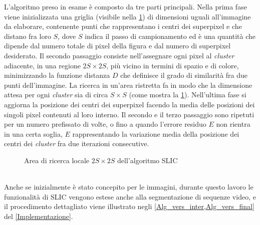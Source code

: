\documentclass[12pt,a4paper,oneside]{article}
\begin{document}
L'algoritmo preso in esame è composto da tre parti principali. Nella prima fase viene inizializzata una griglia (visibile nella \cref{SLIC_grid}) di dimensioni uguali all'immagine da elaborare, contenente punti che rappresentano i centri dei superpixel e che distano fra loro $S$, dove $S$ indica il passo di campionamento ed è una quantità che dipende dal numero totale di pixel della figura e dal numero di superpixel desiderato. Il secondo passaggio consiste nell'assegnare ogni pixel al \textit{cluster} adiacente, in una regione $2S \times 2S$, più vicino in termini di spazio e di colore, minimizzando la funzione distanza $D$ che definisce il grado di similarità fra due punti dell'immagine. La ricerca in un'area ristretta fa in modo che la dimensione attesa per ogni \textit{cluster} sia di circa $S \times S$ (come mostra la \cref{SLIC_grid}). Nell'ultima fase si aggiorna la posizione dei centri dei superpixel facendo la media delle posizioni dei singoli pixel contenuti al loro interno. Il secondo e il terzo passaggio sono ripetuti per un numero prefissato di volte, o fino a quando l'errore residuo $E$ non rientra in una certa soglia, $E$ rappresentando la variazione media della posizione dei centri dei \textit{cluster} fra due iterazioni consecutive.
\begin{figure}[!htb]
\centering
{}
\caption{Area di ricerca locale $2S \times 2S$ dell'algoritmo \acrshort{SLIC}}\label{SLIC_grid}
\end{figure}
\\Anche se inizialmente è stato concepito per le immagini, durante questo lavoro le funzionalità di \gls{SLIC} vengono estese anche alla segmentazione di sequenze video, e il procedimento dettagliato viene illustrato negli \cref{Alg_vers_inter,Alg_vers_final} del \cref{Implementazione}.
\end{document}
